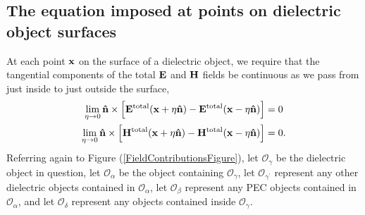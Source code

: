 \documentclass[dvips,letterpaper]{article}
\begin{document}
\subsection{The equation imposed at points on dielectric object surfaces}

At each point $\mathbf{x}$ on the surface of a dielectric object, we require
that the tangential components of the total $\mathbf{E}$ and $\mathbf{H}$ fields
be continuous as we pass from just inside to just outside the 
surface,
\begin{subequations}
\begin{align}
 \lim_{\eta \to 0} \mathbf{\hat n}\times 
 \Big[ \mathbf{E}^{\hbox{\scriptsize{total}}}(\mathbf{x} + \eta\mathbf{\hat n})
      -\mathbf{E}^{\hbox{\scriptsize{total}}}(\mathbf{x} - \eta\mathbf{\hat n})
 \Big] 
&= 0 
\\
 \lim_{\eta \to 0} \mathbf{\hat n}\times 
 \Big[ \mathbf{H}^{\hbox{\scriptsize{total}}}(\mathbf{x} + \eta\mathbf{\hat n})
      -\mathbf{H}^{\hbox{\scriptsize{total}}}(\mathbf{x} - \eta\mathbf{\hat n})
 \Big] 
&= 0.
\label{DielectricEquation1}
\end{align}
\end{subequations}
Referring again to Figure (\ref{FieldContributionsFigure}), let 
$\mathcal{O}_\gamma$ be the dielectric object in question, let 
$\mathcal{O}_\alpha$ be the object containing 
$\mathcal{O}_\gamma$, 
let $\mathcal{O}_{\gamma^\prime}$ represent any other dielectric
objects contained in $\mathcal{O}_\alpha$, 
let $\mathcal{O}_{\beta}$ represent any PEC objects contained 
in $\mathcal{O}_\alpha$, and let $\mathcal{O}_\delta$ represent 
any objects contained inside $\mathcal{O}_\gamma$.
\end{document}
